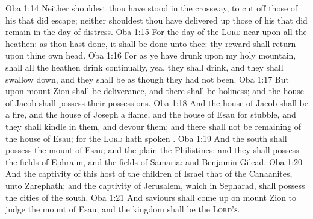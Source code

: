 \vs Oba 1:14 Neither shouldest thou have stood in the crossway, to cut off those of his that did escape; neither shouldest thou have delivered up those of his that did remain in the day of distress.
\vs Oba 1:15 For the day of the \textsc{Lord}  near upon all the heathen: as thou hast done, it shall be done unto thee: thy reward shall return upon thine own head.
\vs Oba 1:16 For as ye have drunk upon my holy mountain,  shall all the heathen drink continually, yea, they shall drink, and they shall swallow down, and they shall be as though they had not been.
\vs Oba 1:17 But upon mount Zion shall be deliverance, and there shall be holiness; and the house of Jacob shall possess their possessions.
\vs Oba 1:18 And the house of Jacob shall be a fire, and the house of Joseph a flame, and the house of Esau for stubble, and they shall kindle in them, and devour them; and there shall not be  remaining of the house of Esau; for the \textsc{Lord} hath spoken .
\vs Oba 1:19 And  the south shall possess the mount of Esau; and  the plain the Philistines: and they shall possess the fields of Ephraim, and the fields of Samaria: and Benjamin  Gilead.
\vs Oba 1:20 And the captivity of this host of the children of Israel  that of the Canaanites,  unto Zarephath; and the captivity of Jerusalem, which  in Sepharad, shall possess the cities of the south.
\vs Oba 1:21 And saviours shall come up on mount Zion to judge the mount of Esau; and the kingdom shall be the \textsc{Lord's}.
